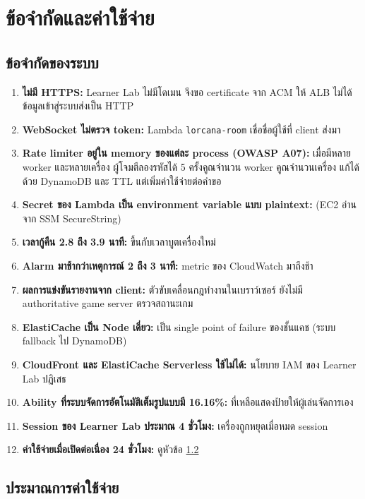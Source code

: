 \chapter{ข้อจำกัดและค่าใช้จ่าย}
\label{ch:limits}

\section{ข้อจำกัดของระบบ}

\begin{enumerate}
    \item \textbf{ไม่มี HTTPS:} Learner Lab ไม่มีโดเมน จึงขอ certificate จาก ACM ให้ ALB ไม่ได้ ข้อมูลเข้าสู่ระบบส่งเป็น HTTP
    \item \textbf{WebSocket ไม่ตรวจ token:} Lambda \texttt{lorcana-room} เชื่อชื่อผู้ใช้ที่ client ส่งมา
    \item \textbf{Rate limiter อยู่ใน memory ของแต่ละ process (OWASP A07):} เมื่อมีหลาย worker และหลายเครื่อง ผู้โจมตีลองรหัสได้ 5 ครั้งคูณจำนวน worker คูณจำนวนเครื่อง แก้ได้ด้วย DynamoDB และ TTL แต่เพิ่มค่าใช้จ่ายต่อคำขอ
    \item \textbf{Secret ของ Lambda เป็น environment variable แบบ plaintext:} (EC2 อ่านจาก SSM SecureString)
    \item \textbf{เวลากู้คืน 2.8 ถึง 3.9 นาที:} ขึ้นกับเวลาบูตเครื่องใหม่
    \item \textbf{Alarm มาช้ากว่าเหตุการณ์ 2 ถึง 3 นาที:} metric ของ CloudWatch มาถึงช้า
    \item \textbf{ผลการแข่งขันรายงานจาก client:} ตัวขับเคลื่อนกฎทำงานในเบราว์เซอร์ ยังไม่มี authoritative game server ตรวจสถานะเกม
    \item \textbf{ElastiCache เป็น Node เดี่ยว:} เป็น single point of failure ของชั้นแคช (ระบบ fallback ไป DynamoDB)
    \item \textbf{CloudFront และ ElastiCache Serverless ใช้ไม่ได้:} นโยบาย IAM ของ Learner Lab ปฏิเสธ
    \item \textbf{Ability ที่ระบบจัดการอัตโนมัติเต็มรูปแบบมี 16.16\%:} ที่เหลือแสดงป้ายให้ผู้เล่นจัดการเอง
    \item \textbf{Session ของ Learner Lab ประมาณ 4 ชั่วโมง:} เครื่องถูกหยุดเมื่อหมด session
    \item \textbf{ค่าใช้จ่ายเมื่อเปิดต่อเนื่อง 24 ชั่วโมง:} ดูหัวข้อ \ref{sec:cost}
\end{enumerate}

\section{ประมาณการค่าใช้จ่าย}
\label{sec:cost}

